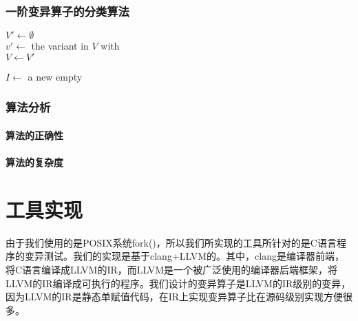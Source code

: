 \documentclass[nofonts]{ctexrep}
\begin{document}
\subsection{一阶变异算子的分类算法}


\begin{algorithm}
  $V' \leftarrow \emptyset$\\
  $v' \leftarrow$ the variant in $V$ with \DefaultSet\\
  $V \leftarrow V'$  
\caption{\filterv}
\label{alg:filterv}
\end{algorithm}

\begin{algorithm}
  {
    $I \leftarrow$ a new empty \ListSet\\
  }
\caption{\filterm}
\label{alg:filterm}
\end{algorithm}

\subsection{算法分析}
\subsubsection{算法的正确性}
\subsubsection{算法的复杂度}

\chapter{工具实现} 
由于我们使用的是POSIX系统fork()，所以我们所实现的工具所针对的是C语言程序的变异测试。我们的实现是基于clang+LLVM的。其中，clang是编译器前端，将C语言编译成LLVM的IR，而LLVM是一个被广泛使用的编译器后端框架，将LLVM的IR编译成可执行的程序。我们设计的变异算子是LLVM的IR级别的变异，因为LLVM的IR是静态单赋值代码，在IR上实现变异算子比在源码级别实现方便很多。
\end{document}
